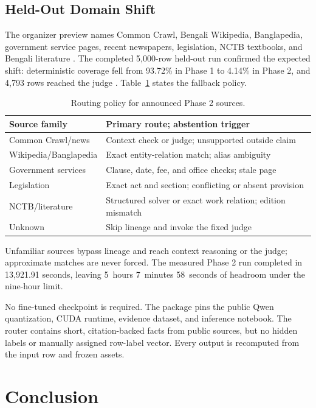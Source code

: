 \documentclass[11pt]{article}
\begin{document}
\subsection{Held-Out Domain Shift}

The organizer preview names Common Crawl, Bengali Wikipedia, Banglapedia, government service pages, recent newspapers, legislation, NCTB textbooks, and Bengali literature \citep{phase2}. The completed 5,000-row held-out run confirmed the expected shift: deterministic coverage fell from 93.72\% in Phase 1 to 4.14\% in Phase 2, and 4,793 rows reached the judge \citep{phase2run}. Table~\ref{tab:shift} states the fallback policy.

\begin{table}[t]
\caption{Routing policy for announced Phase 2 sources.}
\label{tab:shift}
\centering
\small
\begin{tabularx}{\columnwidth}{@{}p{}X@{}}
\toprule
Source family & Primary route; abstention trigger \\
\midrule
Common Crawl/news & Context check or judge; unsupported outside claim \\
Wikipedia/\allowbreak Banglapedia & Exact entity-relation match; alias ambiguity \\
Government services & Clause, date, fee, and office checks; stale page \\
Legislation & Exact act and section; conflicting or absent provision \\
NCTB/literature & Structured solver or exact work relation; edition mismatch \\
Unknown & Skip lineage and invoke the fixed judge \\
\bottomrule
\end{tabularx}
\end{table}

Unfamiliar sources bypass lineage and reach context reasoning or the judge; approximate matches are never forced. The measured Phase 2 run completed in 13,921.91 seconds, leaving 5~hours 7~minutes 58~seconds of headroom under the nine-hour limit.

No fine-tuned checkpoint is required. The package pins the public Qwen quantization, CUDA runtime, evidence dataset, and inference notebook. The router contains short, citation-backed facts from public sources, but no hidden labels or manually assigned row-label vector. Every output is recomputed from the input row and frozen assets.

\section{Conclusion}
\end{document}
